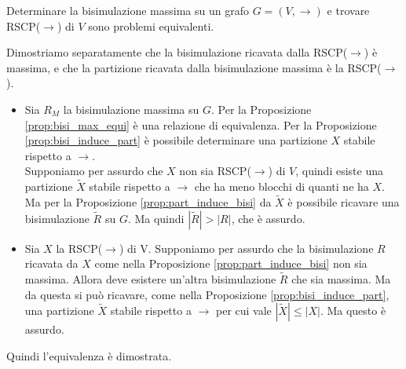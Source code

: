 \begin{corollary}
    Determinare la bisimulazione massima su un grafo $G = (V,\to)$ e trovare RSCP($\to$) di $V$ sono problemi equivalenti.
\end{corollary}
\begin{proof2}
    Dimostriamo separatamente che la bisimulazione ricavata dalla RSCP($\to$) è massima, e che la partizione ricavata dalla bisimulazione massima è la RSCP($\to$).
    \begin{itemize}
        \item Sia $R_M$ la bisimulazione massima su $G$. Per la Proposizione \ref{prop:bisi_max_equi} è una relazione di equivalenza. Per la Proposizione \ref{prop:bisi_induce_part} è possibile determinare una partizione $X$ stabile rispetto a $\to$.\\
              Supponiamo per assurdo che $X$ non sia RSCP($\to$) di $V$, quindi esiste una partizione $\widetilde{X}$ stabile rispetto a $\to$ che ha meno blocchi di quanti ne ha $X$. Ma per la Proposizione \ref{prop:part_induce_bisi} da
              $\widetilde{X}$ è possibile ricavare una bisimulazione $\widetilde{R}$ su $G$. Ma quindi $|\widetilde{R}| > |R|$, che è assurdo.
        \item Sia $X$ la RSCP($\to$) di V. Supponiamo per assurdo che la bisimulazione $R$ ricavata da $X$ come nella Proposizione \ref{prop:part_induce_bisi} non sia massima. Allora deve esistere un'altra bisimulazione $\widetilde{R}$ che
              sia massima. Ma da questa si può ricavare, come nella Proposizione \ref{prop:bisi_induce_part}, una partizione $\widetilde{X}$ stabile rispetto a $\to$ per cui vale $|\widetilde{X}| \leq |X|$. Ma questo è assurdo.
    \end{itemize}
    Quindi l'equivalenza è dimostrata.
\end{proof2}

